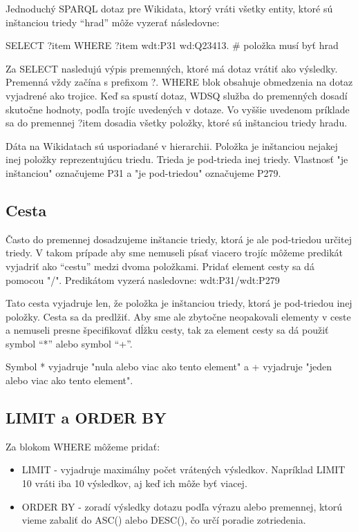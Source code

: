 Jednoduchý SPARQL dotaz pre Wikidata, ktorý vráti všetky entity, ktoré sú inštanciou triedy “hrad” môže vyzerať následovne:

\begin{code}
    SELECT ?item
    WHERE
        {
            ?item wdt:P31 wd:Q23413. # položka musí byť hrad
        }
\end{code}

Za SELECT nasledujú výpis premenných, ktoré má dotaz vrátiť ako výsledky.
Premenná vždy začína s prefixom ?.
WHERE blok obsahuje obmedzenia na dotaz vyjadrené ako trojice.
Keď sa spustí dotaz, WDSQ služba do premenných dosadí skutočne hodnoty, podľa trojíc uvedených
v dotaze. Vo vyššie uvedenom príklade sa do premennej ?item dosadia všetky položky, ktoré sú inštanciou triedy hradu.

Dáta na Wikidatach sú usporiadané v hierarchii. Položka je inštanciou nejakej inej položky reprezentujúcu triedu.
Trieda je pod-trieda inej triedy. Vlastnosť "je inštanciou" označujeme P31 a "je pod-triedou" označujeme P279.

\subsection*{Cesta}
Často do premennej dosadzujeme inštancie triedy, ktorá je ale pod-triedou určitej triedy.
V takom prípade aby sme nemuseli písať viacero trojíc môžeme predikát vyjadriť ako “cestu” medzi dvoma položkami. Pridať element cesty sa dá pomocou "/".
Predikátom vyzerá nasledovne: wdt:P31/wdt:P279

Tato cesta vyjadruje len, že položka je inštanciou triedy, ktorá je pod-triedou inej položky.
Cesta sa da predlžiť.
Aby sme ale zbytočne neopakovali elementy v ceste a nemuseli presne špecifikovať dĺžku cesty, tak za element cesty sa dá použiť
symbol “*” alebo symbol “+”.

Symbol * vyjadruje "nula alebo viac ako tento element" a + vyjadruje "jeden alebo viac ako tento element".

\subsection*{LIMIT a ORDER BY}
Za blokom WHERE{} môžeme pridať:
\begin{itemize}
    \item LIMIT - vyjadruje maximálny počet vrátených výsledkov. Napríklad LIMIT 10 vráti iba
          10 výsledkov, aj keď ich môže byť viacej.
    \item ORDER BY - zoradí výsledky dotazu podľa výrazu alebo premennej, ktorú vieme zabaliť do ASC() alebo DESC(), čo určí poradie zotriedenia.
\end{itemize}

